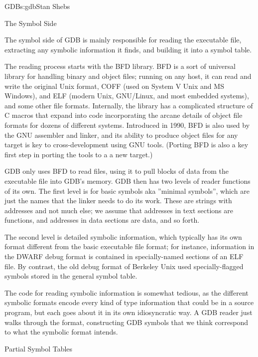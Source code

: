 \begin{aosachapter}{GDB}{s:gdb}{Stan Shebs}
\begin{aosasect1}{The Symbol Side}

The symbol side of GDB is mainly responsible for reading the
executable file, extracting any symbolic information it finds, and
building it into a symbol table.

The reading process starts with the BFD library.  BFD is a sort of
universal library for handling binary and object files; running on any
host, it can read and write the original Unix  format,
COFF (used on System V Unix and MS Windows), and ELF (modern Unix,
GNU/Linux, and most embedded systems), and some other file formats.
Internally, the library has a complicated structure of C macros that
expand into code incorporating the arcane details of object file
formats for dozens of different systems.  Introduced in 1990, BFD is
also used by the GNU assembler and linker, and its ability to produce
object files for any target is key to cross-development using GNU
tools.  (Porting BFD is also a key first step in porting the tools to a
a new target.)

GDB only uses BFD to read files, using it to pull blocks of data
from the executable file into GDB's memory.  GDB then has two levels
of reader functions of its own.  The first level is for basic symbols
aka ''minimal symbols'', which are just the names that the linker needs
to do its work.  These are strings with addresses and not much else;
we assume that addresses in text sections are functions, and addresses
in data sections are data, and so forth.

The second level is detailed symbolic information, which typically has
its own format different from the basic executable file format; for
instance, information in the DWARF debug format is contained in
specially-named sections of an ELF file.  By contrast, the old
 debug format of Berkeley Unix used specially-flagged
symbols stored in the general symbol table.

The code for reading symbolic information is somewhat tedious, as the
different symbolic formats encode every kind of type information that
could be in a source program, but each goes about it in its own
idiosyncratic way.  A GDB reader just walks through the format,
constructing GDB symbols that we think correspond to what the symbolic
format intends.

\end{aosasect1}

\begin{aosasect2}{Partial Symbol Tables}


\end{aosasect2}
\end{aosachapter}
